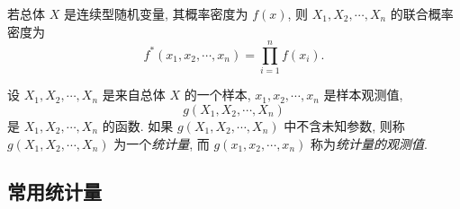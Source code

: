 若总体 $ X $ 是连续型随机变量, 其概率密度为 $ f(x) $, 则 $ X_{1}, X_{2}, \cdots, X_{n} $ 的联合概率密度为 $$ f^{*}\left(x_{1}, x_{2}, \cdots, x_{n}\right)=\prod_{i=1}^{n} f\left(x_{i}\right).$$

\begin{definition}[统计量与其观测值]
    设 $ X_{1}, X_{2}, \cdots, X_{n} $ 是来自总体 $ X $ 的一个样本, $ x_{1}, x_{2}, \cdots, x_{n} $ 是样本观测值, $$ g\left(X_{1}, X_{2}, \cdots, X_{n}\right) $$ 是 $ X_{1}, X_{2}, \cdots, X_{n} $ 的函数. 如果 $ g\left(X_{1}, X_{2}, \cdots, X_{n}\right) $ 中不含未知参数, 则称 $ g\left(X_{1}, X_{2}, \cdots, X_{n}\right) $ 为一个\textit{统计量}, 而 $ g\left(x_{1}, x_{2}, \cdots, x_{n}\right) $ 称为\textit{统计量的观测值}.
\end{definition}

\subsection{常用统计量}

